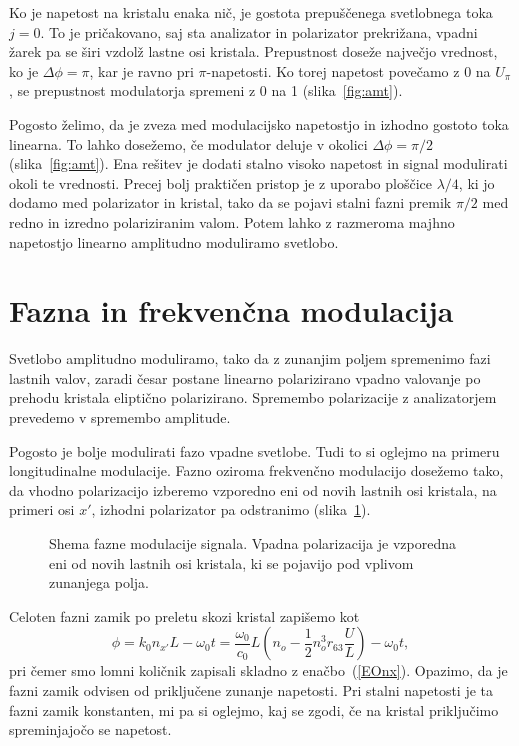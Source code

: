 Ko je napetost na kristalu enaka nič, je gostota prepuščenega svetlobnega toka 
$j=0$. To je pričakovano, saj sta analizator in polarizator prekrižana, 
vpadni žarek pa se širi vzdolž lastne osi kristala.
Prepustnost doseže največjo vrednost, ko je $\Delta \phi=\pi$, kar je ravno pri 
$\pi$-napetosti. Ko torej napetost povečamo z 0 na $U_\pi$, se
prepustnost modulatorja spremeni z 0 na 1 (slika~\ref{fig:amt}).

Pogosto želimo, da je zveza med modulacijsko napetostjo in izhodno
gostoto toka linearna. To lahko dosežemo, če modulator deluje v okolici $\Delta\phi=\pi/2$
(slika~\ref{fig:amt}).
Ena rešitev je dodati stalno visoko napetost in signal modulirati okoli
te vrednosti. Precej bolj praktičen pristop je z uporabo ploščice $\lambda/4$,
ki jo dodamo med polarizator in kristal, tako da se pojavi stalni
fazni premik $\pi/2$ med redno in izredno polariziranim valom. Potem lahko z razmeroma majhno napetostjo
linearno amplitudno moduliramo svetlobo.

\section{Fazna in frekvenčna modulacija}
Svetlobo amplitudno moduliramo, tako da z zunanjim
poljem spremenimo fazi lastnih valov, zaradi česar postane linearno
polarizirano vpadno valovanje po prehodu kristala eliptično polarizirano.
Spremembo polarizacije z analizatorjem prevedemo v spremembo amplitude.

Pogosto je bolje modulirati fazo vpadne svetlobe. Tudi to si oglejmo na primeru longitudinalne
 modulacije. Fazno oziroma 
 frekvenčno modulacijo dosežemo tako,
da vhodno polarizacijo izberemo vzporedno eni od novih lastnih osi kristala, 
na primeri osi $x'$, izhodni polarizator pa odstranimo (slika~\ref{fig:fmshema}). 
\begin{figure}[h]
\centering
\def\svgwidth{80truemm} 

\caption{Shema fazne modulacije signala. Vpadna polarizacija je vzporedna eni od 
novih lastnih osi kristala, ki se pojavijo pod vplivom zunanjega polja.}
\label{fig:fmshema}
\end{figure}

Celoten fazni zamik po preletu skozi kristal zapišemo kot 
\begin{equation}
\phi =  k_0 n_{x'} L -\omega_0 t= \frac{\omega_0}{c_0}L \left(n_o -
\frac{1}{2}n_o^3 r_{63}\frac{U}{L}\right)-\omega_0 t,
\label{fmphi}
\end{equation}
pri čemer smo lomni količnik zapisali skladno z enačbo~(\ref{EOnx}). Opazimo,
da je fazni zamik odvisen od priključene zunanje napetosti. Pri stalni napetosti je 
ta fazni zamik konstanten, mi pa si oglejmo, kaj se zgodi, če na kristal priključimo
spreminjajočo se napetost.

